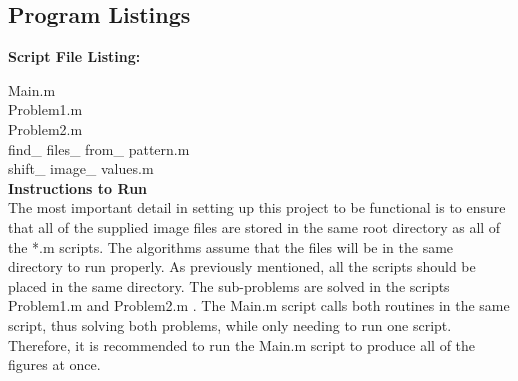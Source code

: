 \documentclass[./rarnold_report2.tex]{subfiles}
\begin{document}


\clearpage
\subsection*{Program Listings}

\noindent \textbf{Script File Listing:}

\noindent Main.m \\
Problem1.m \\
Problem2.m \\
find\_ files\_ from\_ pattern.m \\
shift\_ image\_ values.m \\


\noindent \textbf{Instructions to Run} \\

\noindent The most important detail in setting up this project to be functional is to ensure that all of the supplied image files are stored in the same root directory as all of the *.m scripts.  The algorithms assume that the files will be in the same directory to run properly.  As previously mentioned, all the scripts should be placed in the same directory.  The sub-problems are solved in the scripts Problem1.m and Problem2.m .  The Main.m script calls both routines in the same script, thus solving both problems, while only needing to run one script.  Therefore, it is recommended to run the Main.m script to produce all of the figures at once.  
\end{document}
